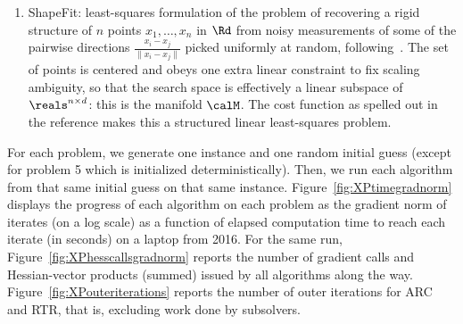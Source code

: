 \begin{enumerate}
	\item ShapeFit: least-squares formulation of the problem of recovering a rigid structure of $n$ points $x_1, \ldots, x_n$ in $\Rd$ from noisy measurements of some of the pairwise directions $\frac{x_i - x_j}{\|x_i - x_j\|}$ picked uniformly at random, following~\citep{hand2018shapefit}. The set of points is centered and obeys one extra linear constraint to fix scaling ambiguity, so that the search space is effectively a linear subspace of $\reals^{n\times d}$: this is the manifold $\calM$. The cost function as spelled out in the reference makes this a structured linear least-squares problem.
\end{enumerate}

For each problem, we generate one instance and one random initial guess (except for problem 5 which is initialized deterministically). Then, we run each algorithm from that same initial guess on that same instance. Figure~\ref{fig:XPtimegradnorm} displays the progress of each algorithm on each problem as the gradient norm of iterates (on a log scale) as a function of elapsed computation time to reach each iterate (in seconds) on a laptop from 2016. For the same run, Figure~\ref{fig:XPhesscallsgradnorm} reports the number of gradient calls and Hessian-vector products (summed) issued by all algorithms along the way. Figure~\ref{fig:XPouteriterations} reports the number of outer iterations for ARC and RTR, that is, excluding work done by subsolvers.


